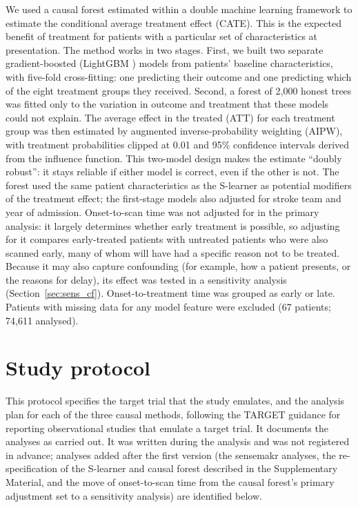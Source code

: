 We used a causal forest estimated within a double machine learning framework  to estimate the conditional average treatment effect (CATE). This is the expected benefit of treatment for patients with a particular set of characteristics at presentation. The method works in two stages. First, we built two separate gradient-boosted (LightGBM ) models from patients’ baseline characteristics, with five-fold cross-fitting: one predicting their outcome and one predicting which of the eight treatment groups they received. Second, a forest of 2,000 honest trees was fitted only to the variation in outcome and treatment that these models could not explain. The average effect in the treated (ATT) for each treatment group was then estimated by augmented inverse-probability weighting (AIPW), with treatment probabilities clipped at 0.01 and 95\% confidence intervals derived from the influence function. This two-model design makes the estimate “doubly robust”: it stays reliable if either model is correct, even if the other is not. The forest used the same patient characteristics as the S-learner as potential modifiers of the treatment effect; the first-stage models also adjusted for stroke team and year of admission. Onset-to-scan time was not adjusted for in the primary analysis: it largely determines whether early treatment is possible, so adjusting for it compares early-treated patients with untreated patients who were also scanned early, many of whom will have had a specific reason not to be treated. Because it may also capture confounding (for example, how a patient presents, or the reasons for delay), its effect was tested in a sensitivity analysis (Section~\ref{sec:sens_cf}). Onset-to-treatment time was grouped as early or late. Patients with missing data for any model feature were excluded (67 patients; 74,611 analysed).


\newpage

\section{Study protocol}\label{sec:protocol}

This protocol specifies the target trial that the study emulates, and the analysis plan for each of the three causal methods, following the TARGET guidance for reporting observational studies that emulate a target trial. It documents the analyses as carried out. It was written during the analysis and was not registered in advance; analyses added after the first version (the sensemakr analyses, the re-specification of the S-learner and causal forest described in the Supplementary Material, and the move of onset-to-scan time from the causal forest's primary adjustment set to a sensitivity analysis) are identified below.

